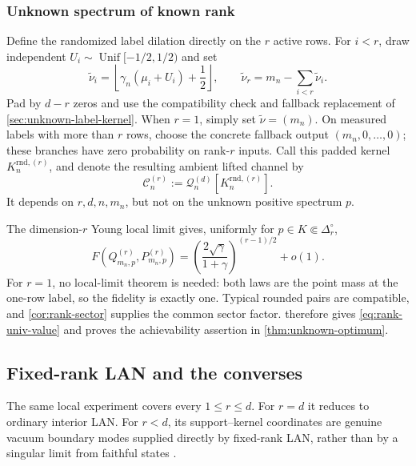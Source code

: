 \documentclass[11pt]{article}
\theoremstyle{remark}
\theoremstyle{plain}
\newcommand{\cC}{\mathcal C}
\begin{document}
\subsubsection{Unknown spectrum of known rank}

Define the randomized label dilation directly on the \(r\) active rows.  For
\(i<r\), draw independent
\(U_i\sim\operatorname{Unif}[-1/2,1/2)\) and set
\[
  \widetilde\nu_i
  =\left\lfloor\gamma_n(\mu_i+U_i)+\frac12\right\rfloor,
  \qquad
  \widetilde\nu_r=m_n-\sum_{i<r}\widetilde\nu_i.
\]
Pad by \(d-r\) zeros and use the compatibility check and fallback
replacement of \cref{sec:unknown-label-kernel}.  When \(r=1\), simply set
\(\widetilde\nu=(m_n)\).  On measured labels with more than \(r\) rows,
choose the concrete fallback output \((m_n,0,\ldots,0)\); these branches
have zero probability on rank-\(r\) inputs.
Call this padded kernel \(K_n^{\mathrm{rnd},(r)}\), and denote the resulting
ambient lifted channel by
\[
  \cC_n^{(r)}:=\mathcal Q_n^{(d)}[K_n^{\mathrm{rnd},(r)}].
\]
It depends on \(r,d,n,m_n\), but not on the unknown positive spectrum
\(p\).

The dimension-\(r\) Young local limit gives, uniformly for
\(p\in K\Subset\Delta_r^\circ\),
\[
  F(Q_{m_n,p}^{(r)},P_{m_n,p}^{(r)})
  =\left(\frac{2\sqrt\gamma}{1+\gamma}\right)^{(r-1)/2}+o(1).
\]
For \(r=1\), no local-limit theorem is needed: both laws are the point mass
at the one-row label, so the fidelity
is exactly one.
Typical rounded pairs are compatible, and \cref{cor:rank-sector} supplies
the common sector factor.   therefore gives
\eqref{eq:rank-univ-value} and proves the achievability assertion in
\cref{thm:unknown-optimum}.

\subsection{Fixed-rank LAN and the converses}
\label{sec:fixed-rank-LAN}

The same local experiment covers every \(1\le r\le d\).  For \(r=d\) it
reduces to ordinary interior LAN.  For \(r<d\), its support--kernel
coordinates are genuine vacuum boundary modes supplied directly by
fixed-rank LAN, rather than by a singular limit from faithful states
\cite{LahiryNussbaum2024}.
\end{document}
